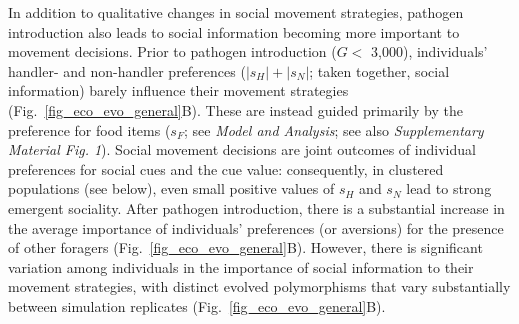 In addition to qualitative changes in social movement strategies, pathogen introduction also leads to social information becoming more important to movement decisions.
Prior to pathogen introduction ($G <$ 3,000), individuals' handler- and non-handler preferences ($|s_H| + |s_N|$; taken together, social information) barely influence their movement strategies (Fig.~\ref{fig_eco_evo_general}B).
These are instead guided primarily by the preference for food items ($s_F$; see \textit{Model and Analysis}; see also \textit{Supplementary Material Fig. 1}).
Social movement decisions are joint outcomes of individual preferences for social cues and the cue value: consequently, in clustered populations (see below), even small positive values of $s_H$ and $s_N$ lead to strong emergent sociality.
After pathogen introduction, there is a substantial increase in the average importance of individuals' preferences (or aversions) for the presence of other foragers (Fig.~\ref{fig_eco_evo_general}B).
However, there is significant variation among individuals in the importance of social information to their movement strategies, with distinct evolved polymorphisms that vary substantially between simulation replicates (Fig.~\ref{fig_eco_evo_general}B).

